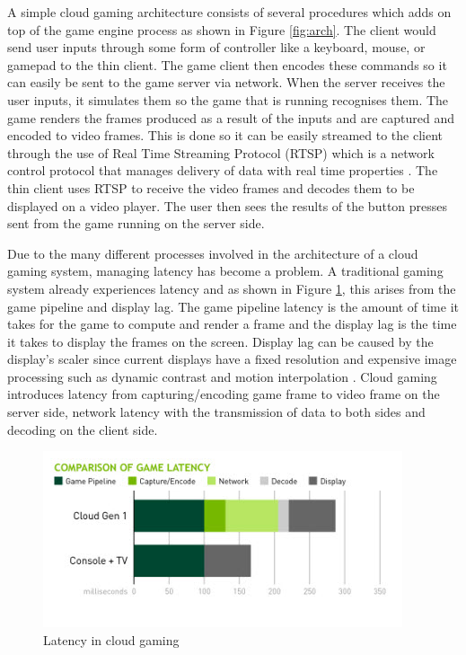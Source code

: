 A simple cloud gaming architecture consists of several procedures which adds on top of the game engine process as shown in Figure \ref{fig:arch}. The client would send user inputs through some form of controller like a keyboard, mouse, or gamepad to the thin client. The game client then encodes these commands so it can easily be sent to the game server via network. When the server receives the user inputs, it simulates them so the game that is running recognises them. The game renders the frames produced as a result of the inputs and are captured and encoded to video frames. This is done so it can be easily streamed to the client through the use of Real Time Streaming Protocol (RTSP) which is a network control protocol that manages delivery of data with real time properties \cite{rtsp}. The thin client uses RTSP to receive the video frames and decodes them to be displayed on a video player. The user then sees the results of the button presses sent from the game running on the server side.
\newline 
\par
Due to the many different processes involved in the architecture of a cloud gaming system, managing latency has become a problem. A traditional gaming system already experiences latency and as shown in Figure \ref{fig:latency}, this arises from the game pipeline and display lag. The game pipeline latency is the amount of time it takes for the game to compute and render a frame and the display lag is the time it takes to display the frames on the screen. Display lag can be caused by the display's scaler since current displays have a fixed resolution and expensive image processing such as dynamic contrast and motion interpolation \cite{displaylag}. Cloud gaming introduces latency from capturing/encoding game frame to video frame on the server side, network latency with the transmission of data to both sides and decoding on the client side.

\begin{figure}[h]
 \centering
 \includegraphics[width=0.8\linewidth]{images/latency.png}
 \caption{Latency in cloud gaming}
 \label{fig:latency}
\end{figure}

